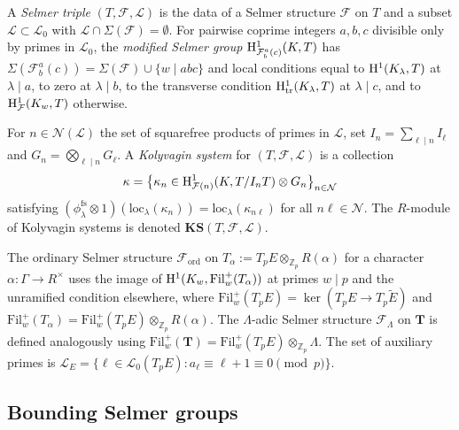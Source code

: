 \begin{definition}
  A \emph{Selmer triple} \((T, \mathcal{F}, \mathcal{L})\) is the data of a Selmer structure \(\mathcal{F}\) on \(T\) and a subset \(\mathcal{L} \subset \mathcal{L}_0\) with \(\mathcal{L} \cap \Sigma(\mathcal{F}) = \emptyset\). For pairwise coprime integers \(a, b, c\) divisible only by primes in \(\mathcal{L}_0\), the \emph{modified Selmer group} \(\mathrm{H}^1_{\mathcal{F}^a_b(c)}(K, T)\) has \(\Sigma(\mathcal{F}^a_b(c)) = \Sigma(\mathcal{F}) \cup \{w \mid abc\}\) and local conditions equal to \(\mathrm{H}^1(K_\lambda, T)\) at \(\lambda \mid a\), to zero at \(\lambda \mid b\), to the transverse condition \(\mathrm{H}^1_{\mathrm{tr}}(K_\lambda, T)\) at \(\lambda \mid c\), and to \(\mathrm{H}^1_{\mathcal{F}}(K_w, T)\) otherwise.

  For \(n \in \mathcal{N}(\mathcal{L})\) the set of squarefree products of primes in \(\mathcal{L}\), set \(I_n = \sum_{\ell \mid n} I_\ell\) and \(G_n = \bigotimes_{\ell \mid n} G_\ell\). A \emph{Kolyvagin system} for \((T, \mathcal{F}, \mathcal{L})\) is a collection
  \[
    \kappa = \bigl\{\kappa_n \in \mathrm{H}^1_{\mathcal{F}(n)}(K, T/I_n T) \otimes G_n\bigr\}_{n \in \mathcal{N}}
  \]
  satisfying \((\phi_\lambda^{\mathrm{fs}} \otimes 1)(\mathrm{loc}_\lambda(\kappa_n)) = \mathrm{loc}_\lambda(\kappa_{n\ell})\) for all \(n\ell \in \mathcal{N}\). The \(R\)-module of Kolyvagin systems is denoted \(\mathbf{KS}(T, \mathcal{F}, \mathcal{L})\).

  The ordinary Selmer structure \(\mathcal{F}_{\mathrm{ord}}\) on \(T_\alpha := T_p E \otimes_{\mathbb{Z}_p} R(\alpha)\) for a character \(\alpha : \Gamma \to R^\times\) uses the image of \(\mathrm{H}^1(K_w, \mathrm{Fil}_w^+(T_\alpha))\) at primes \(w \mid p\) and the unramified condition elsewhere, where \(\mathrm{Fil}_w^+(T_p E) = \ker(T_p E \to T_p \tilde{E})\) and \(\mathrm{Fil}_w^+(T_\alpha) = \mathrm{Fil}_w^+(T_p E) \otimes_{\mathbb{Z}_p} R(\alpha)\). The \(\Lambda\)-adic Selmer structure \(\mathcal{F}_\Lambda\) on \(\mathbf{T}\) is defined analogously using \(\mathrm{Fil}_w^+(\mathbf{T}) = \mathrm{Fil}_w^+(T_p E) \otimes_{\mathbb{Z}_p} \Lambda\). The set of auxiliary primes is \(\mathcal{L}_E = \{\ell \in \mathcal{L}_0(T_p E) : a_\ell \equiv \ell + 1 \equiv 0 \pmod{p}\}\).
\end{definition}

\subsection{Bounding Selmer groups}

